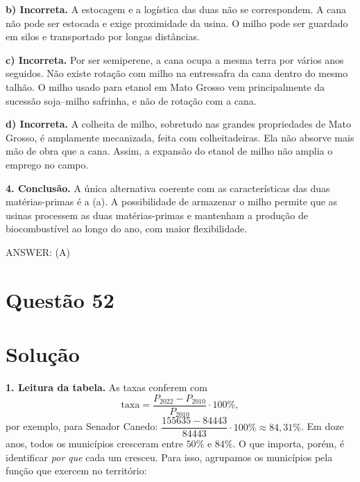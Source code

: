 \documentclass{article}%
\begin{document}
\textbf{b) Incorreta.} A estocagem e a logística das duas não se correspondem. A cana não pode ser estocada e exige proximidade da usina. O milho pode ser guardado em silos e transportado por longas distâncias.

\textbf{c) Incorreta.} Por ser semiperene, a cana ocupa a mesma terra por vários anos seguidos. Não existe rotação com milho na entressafra da cana dentro do mesmo talhão. O milho usado para etanol em Mato Grosso vem principalmente da sucessão soja--milho safrinha, e não de rotação com a cana.

\textbf{d) Incorreta.} A colheita de milho, sobretudo nas grandes propriedades de Mato Grosso, é amplamente mecanizada, feita com colheitadeiras. Ela não absorve mais mão de obra que a cana. Assim, a expansão do etanol de milho não amplia o emprego no campo.

\textbf{4. Conclusão.} A única alternativa coerente com as características das duas matérias-primas é a (a). A possibilidade de armazenar o milho permite que as usinas processem as duas matérias-primas e mantenham a produção de biocombustível ao longo do ano, com maior flexibilidade.

ANSWER: (A)%
\newpage%
\section*{Questão 52}

\section*{Solução}

\textbf{1. Leitura da tabela.} As taxas conferem com
\[
\text{taxa}=\frac{P_{2022}-P_{2010}}{P_{2010}}\cdot 100\%,
\]
por exemplo, para Senador Canedo: $\dfrac{155635-84443}{84443}\cdot 100\% \approx 84{,}31\%$. Em doze anos, todos os municípios cresceram entre $50\%$ e $84\%$. O que importa, porém, é identificar \emph{por que} cada um cresceu. Para isso, agrupamos os municípios pela função que exercem no território:
\end{document}
